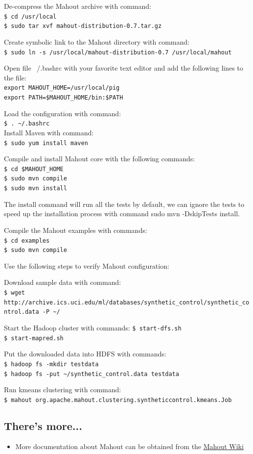 De-compress the Mahout archive with command: \\
\verb|$ cd /usr/local| \\
\verb|$ sudo tar xvf mahout-distribution-0.7.tar.gz|

Create symbolic link to the Mahout directory with command: \\
\verb|$ sudo ln -s /usr/local/mahout-distribution-0.7 /usr/local/mahout |

Open file ~/.bashrc with your favorite text editor and add the following lines to the file: \\
\verb|export MAHOUT_HOME=/usr/local/pig| \\
\verb|export PATH=$MAHOUT_HOME/bin:$PATH|

Load the configuration with command: \\
\verb|$ . ~/.bashrc| \\

Install Maven with command: \\
\verb|$ sudo yum install maven|

Compile and install Mahout core with the following commands:\\
\verb|$ cd $MAHOUT_HOME| \\
\verb|$ sudo mvn compile| \\
\verb|$ sudo mvn install|

The install command will run all the tests by default, we can ignore the tests to speed up the installation process with command sudo mvn -DskipTests install.

Compile the Mahout examples with commands: \\
\verb|$ cd examples| \\
\verb|$ sudo mvn compile|

Use the following steps to verify Mahout configuration:

Download sample data with command: \\
\verb|$ wget http://archive.ics.uci.edu/ml/databases/synthetic_control/synthetic_control.data -P ~/|

Start the Hadoop cluster with commands:
\verb|$ start-dfs.sh| \\
\verb|$ start-mapred.sh|

Put the downloaded data into HDFS with commands: \\
\verb|$ hadoop fs -mkdir testdata| \\
\verb|$ hadoop fs -put ~/synthetic_control.data testdata|

Run kmeans clustering with command: \\
\verb|$ mahout org.apache.mahout.clustering.syntheticcontrol.kmeans.Job|

\subsection*{There's more...}
\begin{itemize}
  \item More documentation about Mahout can be obtained from the \href{https://cwiki.apache.org/confluence/display/MAHOUT/Mahout+Wiki}{Mahout Wiki}
\end{itemize}

